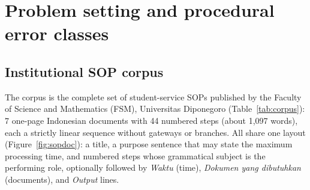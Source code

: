 \documentclass[a4paper,fleqn]{cas-dc}
\begin{document}
\section{Problem setting and procedural error classes}
\label{sec:problem}

\subsection{Institutional SOP corpus}
The corpus is the complete set of student-service SOPs published by the Faculty of Science and Mathematics (FSM), Universitas Diponegoro (Table~\ref{tab:corpus}): 7 one-page Indonesian documents with 44 numbered steps (about 1,097 words), each a strictly linear sequence without gateways or branches. All share one layout (Figure~\ref{fig:sopdoc}): a title, a purpose sentence that may state the maximum processing time, and numbered steps whose grammatical subject is the performing role, optionally followed by \emph{Waktu} (time), \emph{Dokumen yang dibutuhkan} (documents), and \emph{Output} lines.

\begin{table}[!htbp]
\centering
\caption{Characteristics of the 7 FSM Universitas Diponegoro SOP documents. ``PDF steps'' denotes numbered steps in official source documents; ``Graph steps'' denotes nodes in the curated workflow graph.}
\label{tab:corpus}
\small
\setlength{\tabcolsep}{4pt}
\end{table}
\end{document}
